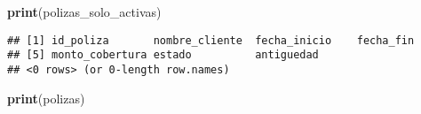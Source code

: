 \documentclass[
]{article}
\newenvironment{Shaded}{\begin{snugshade}}{\end{snugshade}}
\newcommand{\FunctionTok}[1]{\textcolor[rgb]{0.13,0.29,0.53}{\textbf{#1}}}
\newcommand{\NormalTok}[1]{#1}
\begin{document}
\begin{Shaded}
\begin{Highlighting}[]
\FunctionTok{print}\NormalTok{(polizas\_solo\_activas)}
\end{Highlighting}
\end{Shaded}

\begin{verbatim}
## [1] id_poliza       nombre_cliente  fecha_inicio    fecha_fin      
## [5] monto_cobertura estado          antiguedad     
## <0 rows> (or 0-length row.names)
\end{verbatim}

\begin{Shaded}
\begin{Highlighting}[]
\FunctionTok{print}\NormalTok{(polizas)}
\end{Highlighting}
\end{Shaded}
\end{document}
